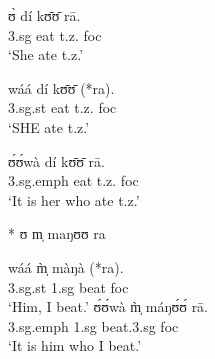 \begin{exe}
\begin{exe}
\begin{exe}
{\begin{exe}
\begin{exe}
\begin{exe}
\begin{exe}
\begin{exe}
\begin{exe}
  \ea\label{ex:GRM-pro-WSE}  \begin{multicols}{2}
   \ea\label{ex:GRM-pro-W}
\gll ʊ̀ dí kʊ̄ʊ̄ rā.\\
  {\sc 3.sg} eat t.z. {\sc foc}\\
\glt  `She ate t.z.' 
   
   \ex\label{ex:GRM-pro-S}
   \gll wáá dí kʊ̄ʊ̄ (*ra).\\
  {\sc 3.sg.st} eat t.z.  {\sc foc}\\
\glt  `SHE ate t.z.' 
   
 \ex\label{ex:GRM-pro-E}  
   \gll ʊ́ʊ́wà dí kʊ̄ʊ̄ rā.\\
  {\sc 3.sg.emph} eat t.z.  {\sc foc}\\
\glt  `It is her who ate t.z.' 

 \ex\label{ex:GRM-pro-W-cleft}  
 * ʊ m̩ maŋʊʊ ra
  
  \ex\label{ex:GRM-pro-S-cleft}  
   \gll  wáá  m̩̀ màŋà (*ra).\\
  {\sc 3.sg.st} {\sc 1.sg}  beat  {\sc foc}\\
 \glt   `Him, I beat.'
  \ex\label{ex:GRM-pro-E-cleft}  
   \gll  ʊ́ʊ́wà  m̩̀ máŋʊ́ʊ́ rā.\\
  {\sc 3.sg.emph}  {\sc 1.sg}  beat.{\sc 3.sg}   {\sc foc}\\
 \glt   `It is him who I beat.'

  \z  
   \end{multicols}
  \z
  

\end{exe}
\end{exe}
\end{exe}
\end{exe}
\end{exe}
\end{exe}}
\end{exe}
\end{exe}
\end{exe}
